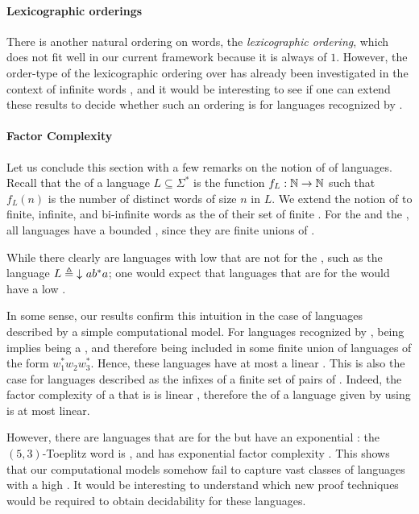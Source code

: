 \paragraph*{Lexicographic orderings} There is another natural ordering on
words, the \emph{lexicographic ordering}, which does not fit well in our
current framework because it is always of  $1$. However, the
order-type of the lexicographic ordering over  has
already been investigated in the context of infinite words \cite{CACOPU18}, and
it would be interesting to see if one can extend these results to decide
whether such an ordering is  for languages recognized by
.

\paragraph*{Factor Complexity} \AP Let us conclude this section with a few
remarks on the notion of  of languages. Recall that the
 of a language $L \subseteq \Sigma^*$ is the function
$f_L: \mathbb{N} \to \mathbb{N}$ such that $f_L(n)$ is the number of distinct words of size
$n$ in $L$. We extend the notion of  to finite, infinite,
and bi-infinite words as the  of their set of finite
. For the  and the , all
 languages have a bounded , since
they are finite unions of .

While there clearly are languages with low  that are not
 for the , such as the language $L
\defined \dwset{ a b^* a }$; one would expect that languages that are
 for the  would have a low .

In some sense, our results confirm this intuition in the case of languages
described by a simple computational model. For languages recognized by
, being  implies being a
, and therefore being  included in some finite union of
languages of the form $w_1^* w_2 w_3^*$. Hence, these languages have at most a
linear . This is also the case for languages described
as the infixes of a finite set of pairs of . Indeed, the
factor complexity of a  that is 
is linear \cite[Theorem 24]{NIPR09}, therefore the  of a
language given by  using  is
at most linear.

However, there are  languages that are
 for the  but have an exponential
: the $(5, 3)$-Toeplitz word is 
\cite[p. 499]{CAKA97}, and has exponential factor complexity \cite[Theorem
5]{CAKA97}. This shows that our computational models somehow fail to capture
vast classes of  languages with a high . It would be interesting to understand which new proof techniques
would be required to obtain decidability for these languages.
